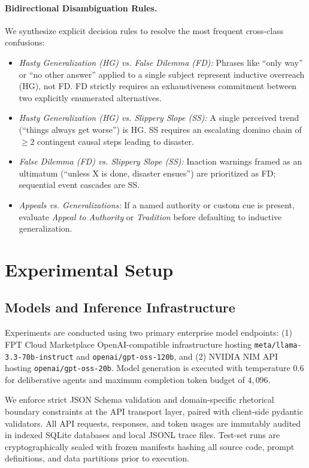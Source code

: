 \documentclass[11pt]{article}
\begin{document}
\paragraph{Bidirectional Disambiguation Rules.}
We synthesize explicit decision rules to resolve the most frequent cross-class confusions:
\begin{itemize}[leftmargin=*,itemsep=1pt,topsep=2pt]
    \item \textit{Hasty Generalization (HG) vs. False Dilemma (FD):} Phrases like ``only way'' or ``no other answer'' applied to a single subject represent inductive overreach (HG), not FD. FD strictly requires an exhaustiveness commitment between two explicitly enumerated alternatives.
    \item \textit{Hasty Generalization (HG) vs. Slippery Slope (SS):} A single perceived trend (``things always get worse'') is HG. SS requires an escalating domino chain of $\ge 2$ contingent causal steps leading to disaster.
    \item \textit{False Dilemma (FD) vs. Slippery Slope (SS):} Inaction warnings framed as an ultimatum (``unless X is done, disaster ensues'') are prioritized as FD; sequential event cascades are SS.
    \item \textit{Appeals vs. Generalizations:} If a named authority or custom cue is present, evaluate \textit{Appeal to Authority} or \textit{Tradition} before defaulting to inductive generalization.
\end{itemize}

\section{Experimental Setup}

\subsection{Models and Inference Infrastructure}
Experiments are conducted using two primary enterprise model endpoints: (1) FPT Cloud Marketplace OpenAI-compatible infrastructure hosting \texttt{meta/llama-3.3-70b-instruct} and \texttt{openai/gpt-oss-120b}, and (2) NVIDIA NIM API hosting \texttt{openai/gpt-oss-20b}. Model generation is executed with temperature $0.6$ for deliberative agents and maximum completion token budget of $4{,}096$.

We enforce strict JSON Schema validation and domain-specific rhetorical boundary constraints at the API transport layer, paired with client-side pydantic validators. All API requests, responses, and token usages are immutably audited in indexed SQLite databases and local JSONL trace files. Test-set runs are cryptographically sealed with frozen manifests hashing all source code, prompt definitions, and data partitions prior to execution.
\end{document}
